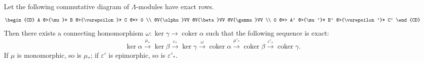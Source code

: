Let the following commutative diagram of $\Lambda$-modules have exact rows.
$$
\begin{CD}
A @>{\mu}>> B @>{\varepsilon}>> C @>>> 0 \\
@V{\alpha}VV @V{\beta}VV @V{\gamma}VV \\
0 @>>> A' @>{\mu'}>> B' @>{\varepsilon'}>> C'
\end{CD}
$$
Then there exists a connecting homomorphism $\omega : \ker \gamma \to \operatorname{coker} \alpha$ such that the following sequence is exact:
$$
\ker \alpha \xrightarrow{\mu_*} \ker \beta \xrightarrow{\varepsilon_*} \ker \gamma \xrightarrow{\omega} \operatorname{coker} \alpha \xrightarrow{\mu'_*} \operatorname{coker} \beta \xrightarrow{\varepsilon'_*} \operatorname{coker} \gamma.
$$
If $\mu$ is monomorphic, so is $\mu_*$; if $\varepsilon'$ is epimorphic, so is $\varepsilon'_*$.
